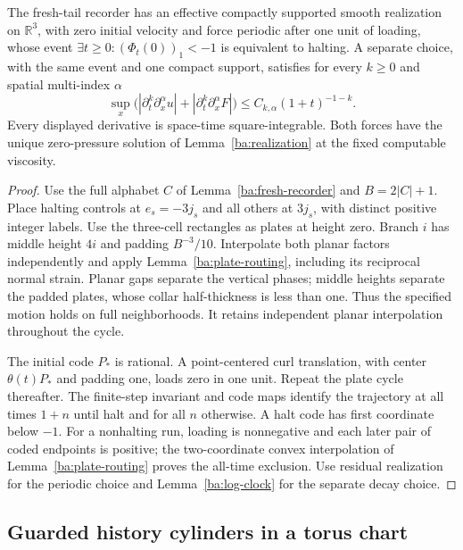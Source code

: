 \begin{theorem}
\label{ba:fresh-flow}
The fresh-tail recorder has an effective compactly supported smooth
realization on $\mathbb R^3$, with zero initial velocity and force
periodic after one unit of loading, whose event
$\exists t\ge0:(\Phi_t(0))_1<-1$ is equivalent to halting.
A separate choice, with the same event and one compact support, satisfies
for every $k\ge0$ and spatial multi-index $\alpha$
\begin{equation}\label{ba:fresh-decay}
 \sup_x\bigl(|\partial_t^k\partial_x^\alpha u|+
             |\partial_t^k\partial_x^\alpha F|\bigr)
 \le C_{k,\alpha}(1+t)^{-1-k}.
\end{equation}
Every displayed derivative is space-time square-integrable.  Both forces
have the unique zero-pressure solution of Lemma~\ref{ba:realization}
at the fixed computable viscosity.
\end{theorem}
\begin{proof}\label{ba:fresh-flow-proof}
Use the full alphabet $C$ of Lemma~\ref{ba:fresh-recorder} and
$B=2|C|+1$.  Place halting controls at $e_s=-3j_s$ and all others
at $3j_s$, with distinct positive integer labels.  Use the three-cell rectangles as
plates at height zero.  Branch $i$ has middle height $4i$ and padding
$B^{-3}/10$.  Interpolate both planar factors independently and apply
Lemma~\ref{ba:plate-routing}, including its reciprocal normal strain.
Planar gaps separate the vertical phases; middle heights separate the
padded plates, whose collar half-thickness is less than one.  Thus the
specified motion holds on full neighborhoods.  It retains independent
planar interpolation throughout the cycle.

The initial code $P_*$ is rational.  A point-centered curl translation,
with center $\theta(t)P_*$ and padding one, loads zero in one unit.
Repeat the plate cycle thereafter.  The finite-step invariant and code
maps identify the trajectory at all times $1+n$ until halt and for all
$n$ otherwise.  A halt code has first coordinate below $-1$.  For a
nonhalting run, loading is nonnegative and each later pair of coded
endpoints is positive; the two-coordinate convex interpolation of
Lemma~\ref{ba:plate-routing} proves the all-time exclusion.
Use residual realization for the periodic choice and
Lemma~\ref{ba:log-clock} for the separate decay choice.
\end{proof}


\subsection{Guarded history cylinders in a torus chart}
\label{ba:guarded-history}

